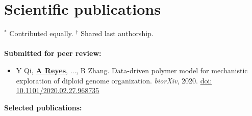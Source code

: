 \documentclass[11pt,a4paper,sans]{moderncv} %
\begin{document}
\section{Scientific publications}
\vspace{-.1cm}
\footnotesize{$^{\ast}$ Contributed equally.} \hspace{.5cm}
\footnotesize{$^{\dagger}$ Shared last authorship.} \\
\\
\vspace{-.1cm}
\textbf{Submitted for peer review:}
\begin{itemize}
\item Y Qi, \textbf{\underline{A Reyes}}, ..., B Zhang. Data-driven
  polymer model for mechanistic exploration of diploid genome
  organization. \textit{biorXiv},
  2020. \href{https://doi.org/10.1101/2020.02.27.968735}{doi: 10.1101/2020.02.27.968735}
\end{itemize}
\vspace{.1cm}
\textbf{Selected publications:}
\end{document}
